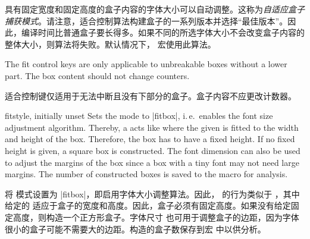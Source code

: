 具有固定宽度和固定高度的盒子内容的字体大小可以自动调整。这称为\emph{自适应盒子捕获模式}。请注意，适合控制算法构建盒子的一系列版本并选择\enquote{最佳版本}。因此，编译时间比普通盒子要长得多。如果不同的所选字体大小不会改变盒子内容的整体大小，则算法将失败。默认情况下， 宏使用此算法。
\medskip
\begin{marker}
The fit control keys are only applicable to unbreakable boxes without
a lower part.
The box content should not change counters.

适合控制键仅适用于无法中断且没有下部分的盒子。盒子内容不应更改计数器。
\end{marker}
\medskip

\enlargethispage*{5mm}
\begin{docTcbKey}{fit}{}{style, initially unset}
Sets the  mode to |fitbox|, i.\,e.\ enables the
font size adjustment algorithm. Thereby, a  acts
like  where the given  is fitted to
the width and height of the box. Therefore, the box has to have a fixed height.
If no fixed height is given, a square box is constructed.
The font dimension  can also be used to adjust
the margins of the box since a box with a tiny font may not need large
margins. The number of constructed boxes is saved to the macro 
for analysis.

将  模式设置为 |fitbox|，即启用字体大小调整算法。因此， 的行为类似于 ，其中给定的  适应于盒子的宽度和高度。因此，盒子必须有固定高度。如果没有给定固定高度，则构造一个正方形盒子。字体尺寸  也可用于调整盒子的边距，因为字体很小的盒子可能不需要大的边距。构造的盒子数保存到宏  中以供分析。
\end{docTcbKey}


